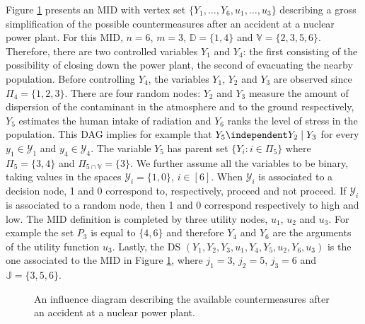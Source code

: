 \begin{example}
Figure \ref{fig-ex} presents an \gls{MID} with vertex set $\{Y_1,\dots, Y_6, u_1,\dots, u_3\}$ describing a gross simplification of the possible countermeasures after an accident at a nuclear power plant. For this \gls{MID}, $n=6$, $m=3$, $\mathbb{D}=\{1,4\}$ and $\mathbb{V}=\{2,3,5,6\}$. Therefore, there are two controlled variables $Y_1$ and $Y_4$: the first consisting of the possibility of closing down the power plant, the second of evacuating the nearby population. Before controlling $Y_4$, the variables $Y_1$, $Y_2$ and $Y_3$ are observed since $\Pi_4=\{1,2,3\}$.
 There are four random nodes: $Y_2$ and $Y_3$ measure the amount of dispersion of the contaminant in the atmosphere and to the ground respectively, $Y_5$ estimates the human intake of radiation and $Y_6$ ranks the level of stress in the population. This \gls{DAG} implies for example that $Y_5\independent Y_2\;|\;Y_3$ for every $y_1\in\mathcal{Y}_1$ and $y_4\in\mathcal{Y}_4$. The variable $Y_5$ has parent set $\{Y_i: i\in \Pi_5\}$ where $\Pi_5=\{3,4\}$ and $\Pi_{5\cap\mathbb{V}}=\{3\}$. We further assume all the variables to be binary, taking values in the spaces $\mathcal{Y}_i=\{1,0\}$, $i\in [6]$. When $\mathcal{Y}_i$ is associated to a decision node, 1 and 0 correspond to, respectively, proceed and not proceed. If  $\mathcal{Y}_i$ is associated to a random node, then 1 and 0 correspond respectively to high and low.
  The \gls{MID} definition is completed by three utility nodes, $u_1$, $u_2$ and $u_3$. For example the set $P_3$ is equal to $\{4,6\}$ and therefore $Y_4$ and $Y_6$ are the arguments of the utility function $u_3$. Lastly, the  \gls{DS} $(Y_1,Y_2,Y_3,u_1,Y_4,Y_5,u_2,Y_6,u_3)$ is the one associated to the \gls{MID} in Figure \ref{fig-ex}, where $j_1=3$, $j_2=5$, $j_3=6$ and $\mathbb{J}=\{3,5,6\}$.  
\end{example}

\begin{figure}
\vspace{0.8cm}
\centerline{
}
\vspace{0.2cm}
\caption{An influence diagram describing the available countermeasures after an accident at a nuclear power plant.}
\label{fig-ex}
\end{figure}

